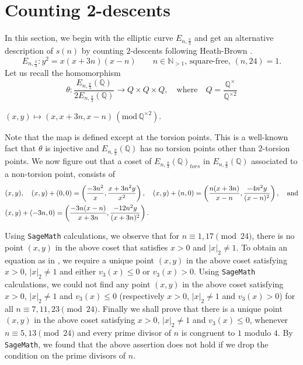 \documentclass[11pt]{article}
\newcommand{\Q}{ {\mathbb{Q}} }
\begin{document}
\section{Counting 2-descents}\label{counting 2-descent}
\noindent In this section, we begin with the elliptic curve $E_{n,\frac{\pi}{3}}$ and get an alternative description of $s(n)$ by counting $2$-descents following Heath-Brown \cite{HeathBrown}.  
$$E_{n,\frac{\pi}{3}} :  y^{2} = x(x+3n)(x-n) \qquad n\in \mathbb{N}_{>1},\, \text{square-free},\, (n,24)=1.$$
Let us recall the homomorphism
$$\theta: \frac{E_{n,\frac{\pi}{3}}(\Q)}{2E_{n,\frac{\pi}{3}}(\Q)}\rightarrow Q\times Q\times Q,\quad \text{where}\quad Q=\frac{\Q^{\times}}{\Q^{\times2}}$$
\begin{center}
$(x,y)\mapsto (x,x+3n,x-n)\,(\mathrm{mod} \,\Q^{\times2}).$
\end{center}
Note that the map is defined except at the torsion points. This is a well-known fact that $\theta$ is injective and $E_{n,\frac{\pi}{3}}(\Q)$ has no torsion points other than $2$-torsion points. We now figure out that a coset of $E_{n,\frac{\pi}{3}}(\Q)_{tors}$ in $E_{n,\frac{\pi}{3}}(\Q)$ associated to a non-torsion point, consists of 
\begin{align}\label{coset}
&(x,y),\quad (x,y)+(0,0)=\left(\frac{-3n^{2}}{x},\frac{x+3n^{2}y}{x^{2}}\right),   \quad (x,y)+(n,0)=\left(\frac{n(x+3n)}{x-n},\frac{-4n^{2}y}{(x-n)^{2}}\right), \quad \text{and}\\&(x,y)+(-3n,0)=\left(\frac{-3n(x-n)}{x+3n},\frac{-12n^{2}y}{(x+3n)^{2}}\right) \notag.
\end{align} 

\noindent Using \texttt{SageMath} calculations, we observe that for $n \equiv 1, 17 \pmod{24} $, there is no point $(x,y)$ in the above coset that satisfies $x>0$ and $|x|_{2}\neq 1$. To obtain an equation as in \cite{HeathBrown}, we require a unique point $(x,y)$ in the above coset satisfying $x>0$, $|x|_{2}\neq 1$ and either $v_{3}(x) \leq 0$ or $v_{3}(x)> 0$.
Using \texttt{SageMath} calculations, we could not find any point $(x,y)$ in the above coset satisfying $x>0$, $|x|_{2}\neq 1$ and  $v_{3}(x) \leq 0$ (respectively $x>0$, $|x|_{2}\neq 1$ and $v_{3}(x)> 0$) for all $n \equiv 7,11,23 \pmod{24}$. Finally we shall prove that there is a unique point $(x,y)$ in the above coset satisfying $x>0$, $|x|_{2}\neq 1$ and $v_{3}(x) \leq 0$, whenever $n \equiv 5,13 \pmod{24}$ and every prime divisor of $n$ is congruent to $1$ modulo $4$. By \texttt{SageMath}, we found that the above assertion does not hold if we drop the condition on the prime divisors of $n$.\\
\end{document}
